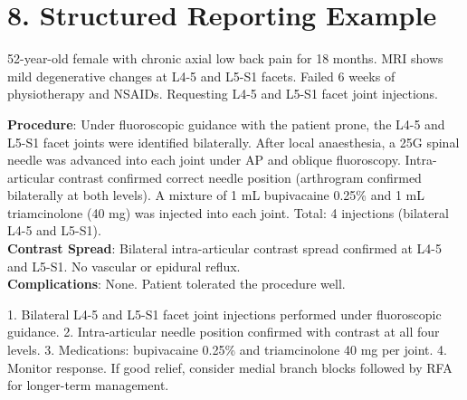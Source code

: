 \section{8. Structured Reporting Example}

\begin{testbox}[Indications:]
52-year-old female with chronic axial low back pain for 18 months. MRI shows mild degenerative changes at L4-5 and L5-S1 facets. Failed 6 weeks of physiotherapy and NSAIDs. Requesting L4-5 and L5-S1 facet joint injections.
\end{testbox}
\begin{refbox}[Findings:]
\textbf{Procedure}: Under fluoroscopic guidance with the patient prone, the L4-5 and L5-S1 facet joints were identified bilaterally. After local anaesthesia, a 25G spinal needle was advanced into each joint under AP and oblique fluoroscopy. Intra-articular contrast confirmed correct needle position (arthrogram confirmed bilaterally at both levels). A mixture of 1 mL bupivacaine 0.25\% and 1 mL triamcinolone (40 mg) was injected into each joint. Total: 4 injections (bilateral L4-5 and L5-S1).\\
\textbf{Contrast Spread}: Bilateral intra-articular contrast spread confirmed at L4-5 and L5-S1. No vascular or epidural reflux.\\
\textbf{Complications}: None. Patient tolerated the procedure well.
\end{refbox}
\begin{pearlbox}[Impression:]
1. Bilateral L4-5 and L5-S1 facet joint injections performed under fluoroscopic guidance.
2. Intra-articular needle position confirmed with contrast at all four levels.
3. Medications: bupivacaine 0.25\% and triamcinolone 40 mg per joint.
4. Monitor response. If good relief, consider medial branch blocks followed by RFA for longer-term management.
\end{pearlbox}

\clearpage
